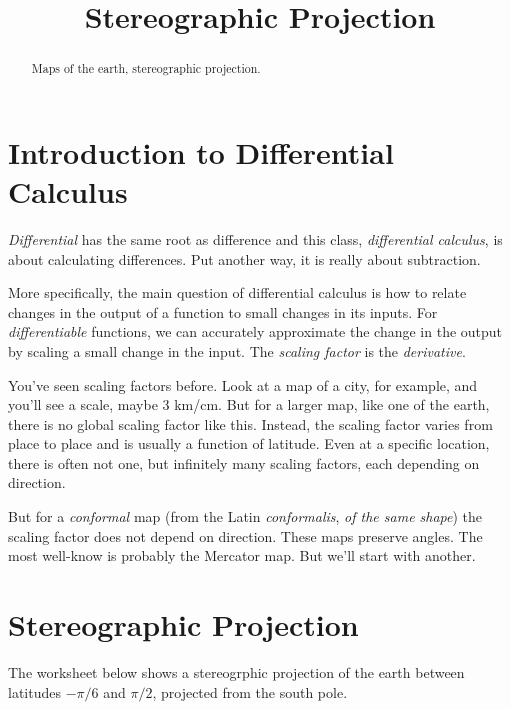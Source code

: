\documentclass{ximera}
\title{Stereographic Projection}
\begin{document}
\begin{abstract}
Maps of the earth, stereographic projection.
\end{abstract}
\maketitle


\section{Introduction to Differential Calculus}

\emph{Differential} has the same root as difference and this class, \emph{differential calculus}, is about calculating differences. Put another way, it is really about subtraction.

More specifically, the main question of differential calculus is how to relate changes in the output of a function to small changes in its inputs. For \emph{differentiable} functions, we can accurately approximate the change in the output by scaling a small change in the input. The \emph{scaling factor} is the \emph{derivative}.

You've seen scaling factors before. Look at a map of a city, for example, and you'll see a scale, maybe 3 km/cm. But for a larger map, like one of the earth, there is no global scaling factor like this. Instead, the scaling factor varies from place to place and is usually a function of latitude. Even at a specific location, there is often not one, but infinitely many scaling factors, each depending on direction. 

But for a \emph{conformal} map (from the Latin \emph{conformalis}, \emph{of the same shape}) the scaling factor does not depend on direction. These maps preserve angles. The most well-know is probably the Mercator map. But we'll start with another.

\section{Stereographic Projection}

The worksheet below shows a stereogrphic projection of the earth between latitudes $-\pi/6$ and $\pi/2$, projected from the south pole.

\begin{onlineOnly}
    \begin{center}
\end{center}
\end{onlineOnly}
\end{document}
